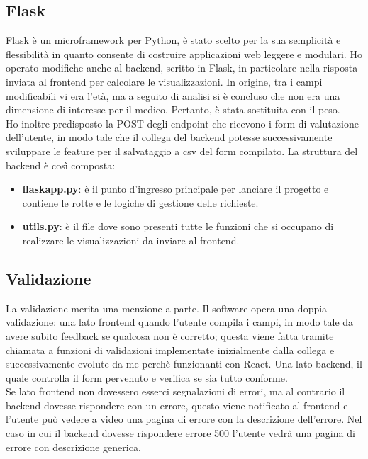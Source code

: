 \subsection{Flask}
Flask è un microframework per Python, è stato scelto per la sua semplicità e flessibilità in quanto consente di costruire applicazioni web leggere e modulari.
Ho operato modifiche anche al backend, scritto in Flask, in particolare nella risposta inviata al frontend per calcolare le visualizzazioni. In origine, tra i campi modificabili vi era l'età, ma a seguito di analisi si è concluso che non era una dimensione di interesse per il medico. Pertanto, è stata sostituita con il peso.\\ 
Ho inoltre predisposto la POST degli endpoint che ricevono i form di valutazione dell'utente, in modo tale che il collega del backend potesse successivamente sviluppare le feature per il salvataggio a csv del form compilato.
La struttura del backend è così composta: 
\begin{itemize}
    \item \textbf{flaskapp.py}: è il punto d'ingresso principale per lanciare il progetto e contiene le rotte e le logiche di gestione delle richieste.
    \item \textbf{utils.py}: è il file dove sono presenti tutte le funzioni che si occupano di realizzare le visualizzazioni da inviare al frontend.
\end{itemize}

\subsection{Validazione}
La validazione merita una menzione a parte. Il software opera una doppia validazione: una lato frontend quando l'utente compila i campi, in modo tale da avere subito feedback se qualcosa non è corretto; questa viene fatta tramite chiamata a funzioni di validazioni implementate inizialmente dalla collega e successivamente evolute da me perchè funzionanti con React. Una lato backend, il quale controlla il form pervenuto e verifica se sia tutto conforme.\\
Se lato frontend non dovessero esserci segnalazioni di errori, ma al contrario il backend dovesse rispondere con un errore, questo viene notificato al frontend e l'utente può vedere a video una pagina di errore con la descrizione dell'errore. Nel caso in cui il backend dovesse rispondere errore 500 l'utente vedrà una pagina di errore con descrizione generica. 

